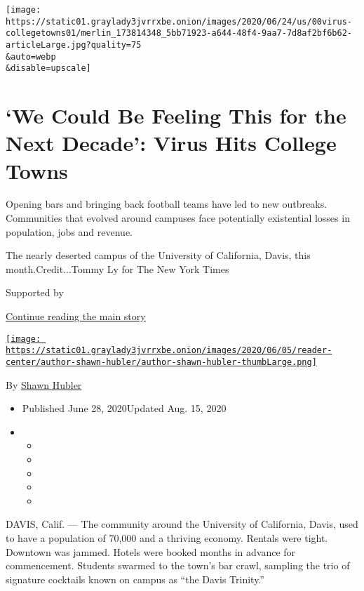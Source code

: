 \texttt{[image: https://static01.graylady3jvrrxbe.onion/images/2020/06/24/us/00virus-collegetowns01/merlin\_173814348\_5bb71923-a644-48f4-9aa7-7d8af2bf6b62-articleLarge.jpg?quality=75\\\&auto=webp\\\&disable=upscale]}

\hypertarget{we-could-be-feeling-this-for-the-next-decade-virus-hits-college-towns}{%
\section{`We Could Be Feeling This for the Next Decade': Virus Hits
College
Towns}\label{we-could-be-feeling-this-for-the-next-decade-virus-hits-college-towns}}

Opening bars and bringing back football teams have led to new outbreaks.
Communities that evolved around campuses face potentially existential
losses in population, jobs and revenue.

The nearly deserted campus of the University of California, Davis, this
month.Credit...Tommy Ly for The New York Times

Supported by

\protect\hyperlink{after-sponsor}{Continue reading the main story}

\href{https://www.nytimes3xbfgragh.onion/by/shawn-hubler}{\texttt{[image: https://static01.graylady3jvrrxbe.onion/images/2020/06/05/reader-center/author-shawn-hubler/author-shawn-hubler-thumbLarge.png]}}

By \href{https://www.nytimes3xbfgragh.onion/by/shawn-hubler}{Shawn
Hubler}

\begin{itemize}
\item
  Published June 28, 2020Updated Aug. 15, 2020
\item
  \begin{itemize}
  \item
  \item
  \item
  \item
  \item
  \end{itemize}
\end{itemize}

DAVIS, Calif. --- The community around the University of California,
Davis, used to have a population of 70,000 and a thriving economy.
Rentals were tight. Downtown was jammed. Hotels were booked months in
advance for commencement. Students swarmed to the town's bar crawl,
sampling the trio of signature cocktails known on campus as ``the Davis
Trinity.''

